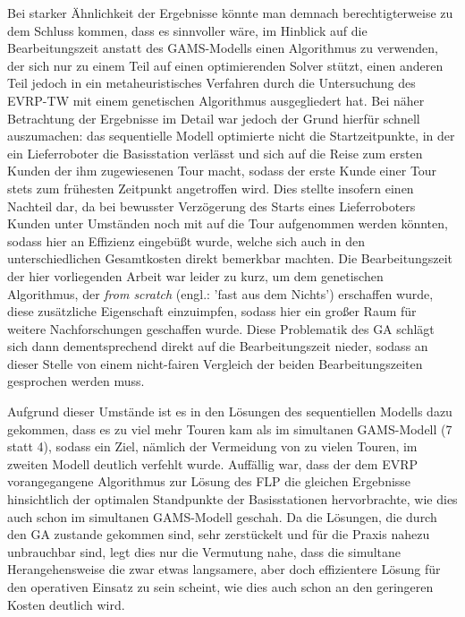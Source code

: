 \documentclass[a4paper,12pt,parskip,bibtotoc,liststotoc]{article}
\begin{document}
Bei starker Ähnlichkeit der Ergebnisse könnte man demnach berechtigterweise zu dem Schluss kommen, dass es sinnvoller wäre, im Hinblick auf die Bearbeitungszeit anstatt des GAMS-Modells einen Algorithmus zu verwenden, der sich nur zu einem Teil auf einen optimierenden Solver stützt, einen anderen Teil jedoch in ein metaheuristisches Verfahren durch die Untersuchung des EVRP-TW mit einem genetischen Algorithmus ausgegliedert hat.
Bei näher Betrachtung der Ergebnisse im Detail war jedoch der Grund hierfür schnell auszumachen: das sequentielle Modell optimierte nicht die Startzeitpunkte, in der ein Lieferroboter die Basisstation verlässt und sich auf die Reise zum ersten Kunden der ihm zugewiesenen Tour macht, sodass der erste Kunde einer Tour stets zum frühesten Zeitpunkt angetroffen wird. 
Dies stellte insofern einen Nachteil dar, da bei bewusster Verzögerung des Starts eines Lieferroboters Kunden unter Umständen noch mit auf die Tour aufgenommen werden könnten, sodass hier an Effizienz eingebüßt wurde, welche sich auch in den unterschiedlichen Gesamtkosten direkt bemerkbar machten.
Die Bearbeitungszeit der hier vorliegenden Arbeit war leider zu kurz, um dem genetischen Algorithmus, der \textit{from scratch} (engl.: 'fast aus dem Nichts') erschaffen wurde, diese zusätzliche Eigenschaft einzuimpfen, sodass hier ein großer Raum für weitere Nachforschungen geschaffen wurde.
Diese Problematik des GA schlägt sich dann dementsprechend direkt auf die Bearbeitungszeit nieder, sodass an dieser Stelle von einem nicht-fairen Vergleich der beiden Bearbeitungszeiten gesprochen werden muss.

Aufgrund dieser Umstände ist es in den Lösungen des sequentiellen Modells dazu gekommen, dass es zu viel mehr Touren kam als im simultanen GAMS-Modell (7 statt 4), sodass ein Ziel, nämlich der Vermeidung von zu vielen Touren, im zweiten Modell deutlich verfehlt wurde.
Auffällig war, dass der dem EVRP vorangegangene Algorithmus zur Lösung des FLP die gleichen Ergebnisse hinsichtlich der optimalen Standpunkte der Basisstationen hervorbrachte, wie dies auch schon im simultanen GAMS-Modell geschah. 
Da die Lösungen, die durch den GA zustande gekommen sind, sehr zerstückelt und für die Praxis nahezu unbrauchbar sind, legt dies nur die Vermutung nahe, dass die simultane Herangehensweise die zwar etwas langsamere, aber doch effizientere Lösung für den operativen Einsatz zu sein scheint, wie dies auch schon an den geringeren Kosten deutlich wird.	
\end{document}
